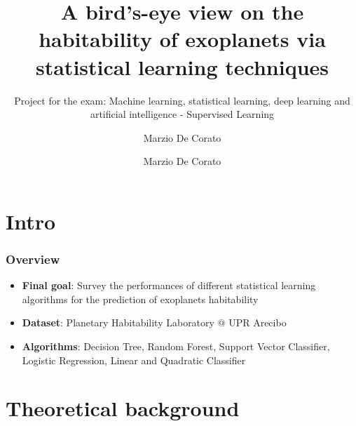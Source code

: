 \documentclass[compress]{beamer}
\author{Marzio De Corato}
\title[Exoplanets survey via SL techniques]{A bird’s-eye view on the habitability of exoplanets via statistical learning techniques}
\author{}
\date{}
\subtitle{Project for the exam: Machine learning, statistical
learning, deep learning and artificial intelligence - Supervised Learning}
\begin{document}
\frame{\vspace{+4.5cm}\titlepage}

\usebackgroundtemplate{ } 

\author{Marzio De Corato}

\section{Intro}

\begin{frame}
\frametitle{Overview}
\begin{itemize}
\item\textbf{Final goal}: Survey the performances of different statistical learning algorithms for the prediction of exoplanets habitability
\item\textbf{Dataset}: Planetary Habitability Laboratory @ UPR Arecibo \cite{planet_dataset}
\item\textbf{Algorithms}: Decision Tree, Random Forest, Support Vector Classifier, Logistic Regression, Linear and Quadratic Classifier
\end{itemize}
\end{frame}

\section{Theoretical background}
\end{document}
